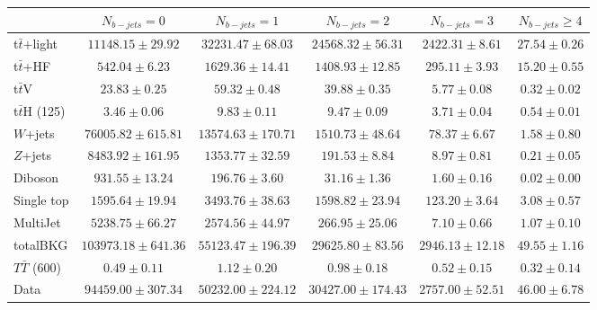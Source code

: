 \begin{tabular}{l c c c c c } \toprule
 & $N_{b-jets}= 0$ & $N_{b-jets}= 1$ & $N_{b-jets}= 2$ & $N_{b-jets}= 3$ & $N_{b-jets}\geq 4$ \\ \midrule 
 t$\bar{t}$+light & $11148.15 \pm 29.92$  & $32231.47 \pm 68.03$  & $24568.32 \pm 56.31$  & $2422.31 \pm 8.61$  & $27.54 \pm 0.26$  \\ 
 t$\bar{t}$+HF & $542.04 \pm 6.23$  & $1629.36 \pm 14.41$  & $1408.93 \pm 12.85$  & $295.11 \pm 3.93$  & $15.20 \pm 0.55$  \\ \midrule 
 t$\bar{t}$V & $23.83 \pm 0.25$  & $59.32 \pm 0.48$  & $39.88 \pm 0.35$  & $5.77 \pm 0.08$  & $0.32 \pm 0.02$  \\ 
 t$\bar{t}$H (125) & $3.46 \pm 0.06$  & $9.83 \pm 0.11$  & $9.47 \pm 0.09$  & $3.71 \pm 0.04$  & $0.54 \pm 0.01$  \\ 
 $W$+jets & $76005.82 \pm 615.81$  & $13574.63 \pm 170.71$  & $1510.73 \pm 48.64$  & $78.37 \pm 6.67$  & $1.58 \pm 0.80$  \\ 
 $Z$+jets & $8483.92 \pm 161.95$  & $1353.77 \pm 32.59$  & $191.53 \pm 8.84$  & $8.97 \pm 0.81$  & $0.21 \pm 0.05$  \\ 
 Diboson & $931.55 \pm 13.24$  & $196.76 \pm 3.60$  & $31.16 \pm 1.36$  & $1.60 \pm 0.16$  & $0.02 \pm 0.00$  \\ 
 Single top & $1595.64 \pm 19.94$  & $3493.76 \pm 38.63$  & $1598.82 \pm 23.94$  & $123.20 \pm 3.64$  & $3.08 \pm 0.57$  \\ 
 MultiJet & $5238.75 \pm 66.27$  & $2574.56 \pm 44.97$  & $266.95 \pm 25.06$  & $7.10 \pm 0.66$  & $1.07 \pm 0.10$  \\ \midrule 
 totalBKG & $103973.18 \pm 641.36$  & $55123.47 \pm 196.39$  & $29625.80 \pm 83.56$  & $2946.13 \pm 12.18$  & $49.55 \pm 1.16$  \\ \midrule 
 $T\bar{T}$ (600) & $0.49 \pm 0.11$  & $1.12 \pm 0.20$  & $0.98 \pm 0.18$  & $0.52 \pm 0.15$  & $0.32 \pm 0.14$  \\ \midrule 
 Data & $94459.00 \pm 307.34$  & $50232.00 \pm 224.12$  & $30427.00 \pm 174.43$  & $2757.00 \pm 52.51$  & $46.00 \pm 6.78$  \\ 
 \bottomrule\end{tabular}